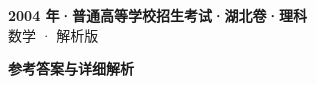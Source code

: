 \documentclass[zihao=-4, a4paper]{ctexart}
\begin{document}
\begin{center}
  {\Large\bfseries 2004 年·普通高等学校招生考试·湖北卷·理科}\\[4pt]
  {\large 数学 · 解析版}
\end{center}
\medskip
{}

\clearpage
{}
\begin{center}{\Large\bfseries 参考答案与详细解析}\end{center}
\medskip

\end{document}
